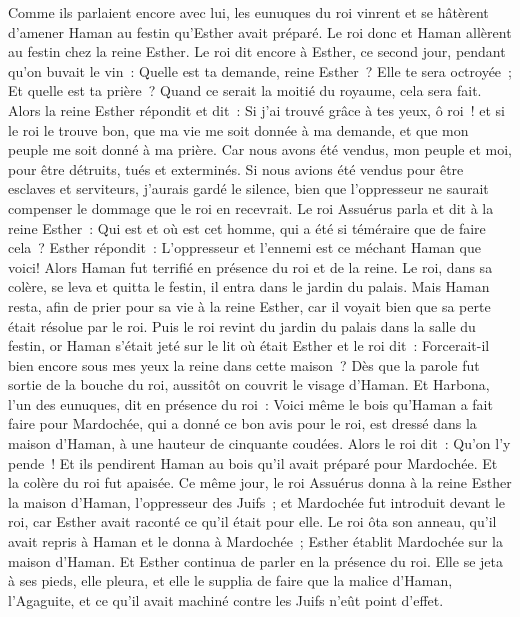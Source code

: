 \begin{multicols}{2}
Comme ils parlaient encore avec lui, les eunuques du roi vinrent et se hâtèrent d'amener Haman au festin qu'Esther avait préparé.
\VerseOne{}Le roi donc et Haman allèrent au festin chez la reine Esther.
Le roi dit encore à Esther, ce second jour, pendant qu'on buvait le vin~: Quelle est ta demande, reine Esther~? Elle te sera octroyée~; Et quelle est ta prière~? Quand ce serait la moitié du royaume, cela sera fait.
Alors la reine Esther répondit et dit~: Si j'ai trouvé grâce à tes yeux, ô roi~! et si le roi le trouve bon, que ma vie me soit donnée à ma demande, et que mon peuple me soit donné à ma prière.
Car nous avons été vendus, mon peuple et moi, pour être détruits, tués et exterminés. Si nous avions été vendus pour être esclaves et serviteurs, j'aurais gardé le silence, bien que l'oppresseur ne saurait compenser le dommage que le roi en recevrait.
Le roi Assuérus parla et dit à la reine Esther~: Qui est et où est cet homme, qui a été si téméraire que de faire cela~?
Esther répondit~: L'oppresseur et l'ennemi est ce méchant Haman que voici! Alors Haman fut terrifié en présence du roi et de la reine.
Le roi, dans sa colère, se leva et quitta le festin, il entra dans le jardin du palais. Mais Haman resta, afin de prier pour sa vie à la reine Esther, car il voyait bien que sa perte était résolue par le roi.
Puis le roi revint du jardin du palais dans la salle du festin, or Haman s'était jeté sur le lit où était Esther et le roi dit~: Forcerait-il bien encore sous mes yeux la reine dans cette maison~? Dès que la parole fut sortie de la bouche du roi, aussitôt on couvrit le visage d'Haman.
Et Harbona, l'un des eunuques, dit en présence du roi~: Voici même le bois qu'Haman a fait faire pour Mardochée, qui a donné ce bon avis pour le roi, est dressé dans la maison d'Haman, à une hauteur de cinquante coudées. Alors le roi dit~: Qu'on l'y pende~!
Et ils pendirent Haman au bois qu'il avait préparé pour Mardochée. Et la colère du roi fut apaisée.
\VerseOne{}Ce même jour, le roi Assuérus donna à la reine Esther la maison d'Haman, l'oppresseur des Juifs~; et Mardochée fut introduit devant le roi, car Esther avait raconté ce qu'il était pour elle.
Le roi ôta son anneau, qu'il avait repris à Haman et le donna à Mardochée~; Esther établit Mardochée sur la maison d'Haman.
Et Esther continua de parler en la présence du roi. Elle se jeta à ses pieds, elle pleura, et elle le supplia de faire que la malice d'Haman, l'Agaguite, et ce qu'il avait machiné contre les Juifs n'eût point d'effet.

\end{multicols}

